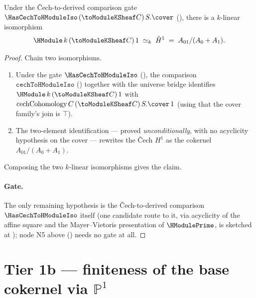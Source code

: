 \begin{theorem}
  \label{thm:adelic_HModuleOne_linearEquiv_cokernel}
  \notready  %
  Under the Čech-to-derived comparison gate
  \(\HasCechToHModuleIso\, (\toModuleKSheaf C)\, S.\cover\)
  (), there is a \(k\)-linear
  isomorphism
  \[
    \HModule\, k\, (\toModuleKSheaf C)\, 1
    \;\simeq_k\; \check{H}^1 \;=\; A_{01}/(A_0 + A_1).
  \]
\end{theorem}
\begin{proof}
  Chain two isomorphisms.
  \begin{enumerate}
    \item Under the gate \(\HasCechToHModuleIso\)
      (), the comparison
      \(\texttt{cechToHModuleIso}\) ()
      together with the universe bridge
       identifies
      \(\HModule\, k\, (\toModuleKSheaf C)\, 1\) with
      \(\mathrm{cechCohomology}\, C\, (\toModuleKSheaf C)\, S.\cover\,
      1\) (using that the cover family's join is \(\top\)).
    \item The two-element identification
       --- proved
      \emph{unconditionally}, with no acyclicity hypothesis on the
      cover --- rewrites the Čech \(H^1\) as the cokernel
      \(A_{01}/(A_0 + A_1)\).
  \end{enumerate}
  Composing the two \(k\)-linear isomorphisms gives the claim.
  \paragraph{Gate.} The only remaining hypothesis is the
  Čech-to-derived comparison \(\HasCechToHModuleIso\) itself (one
  candidate route to it, via acyclicity of the affine square and the
  Mayer--Vietoris presentation of \(\HModulePrime\), is sketched at
  );
  node N5 above () needs no gate at
  all.
\end{proof}

\section{Tier 1b --- finiteness of the base cokernel via \(\mathbb{P}^1\)}
\label{sec:RiemannRoch_Adelic_finiteness}

